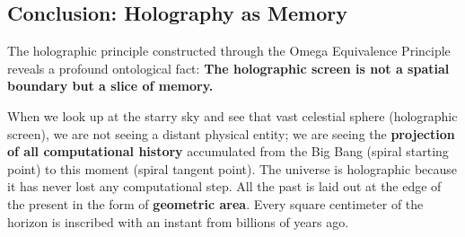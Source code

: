\subsection{Conclusion: Holography as Memory}

The holographic principle constructed through the Omega Equivalence Principle reveals a profound ontological fact:
\textbf{The holographic screen is not a spatial boundary but a slice of memory.}

When we look up at the starry sky and see that vast celestial sphere (holographic screen), we are not seeing a distant physical entity; we are seeing the \textbf{projection of all computational history} accumulated from the Big Bang (spiral starting point) to this moment (spiral tangent point).
The universe is holographic because it has never lost any computational step. All the past is laid out at the edge of the present in the form of \textbf{geometric area}. Every square centimeter of the horizon is inscribed with an instant from billions of years ago.
